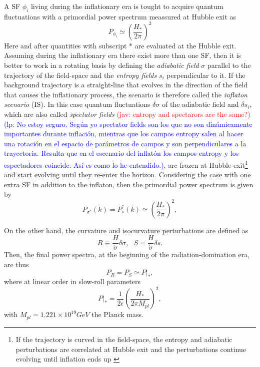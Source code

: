 \documentclass[amssymb,twocolumn,prd,nofootinbib,showpacs]{revtex4-1}
\newcommand{\jav}[1]{\textcolor{red}{(jav: #1)}}
\newcommand{\lp}[1]{\textcolor{blue}{(lp: #1)}}
\begin{document}
%
A  SF $\phi_i$ living  during  the  inflationary  era  is  tought
to acquire quantum fluctuations with a primordial power
spectrum meassured at Hubble exit as
\begin{equation}\label{eq1}
P_{\phi_i}\simeq\left(\frac{H_*}{2\pi}\right)^2
\end{equation}
Here  and  after  quantities  with subscript $*$  are evaluated at the Hubble exit. 
%
Assuming during the inflationary era there exist more than one SF,  then it  is  better  to  work  in  a  rotating  basis by
 defining the \textit{adiabatic field} $\sigma$ parallel  to  the  trajectory  of the field-space 
 and the \textit{entropy fields} $s_i$ perpendicular to it. 
 If the background trajectory is a straight-line that evolves in the direction of the field that causes the inflationary process, 
 the scenario is therefore called the \textit{inflaton scenario} (IS). 
 In this  case quantum fluctuations $\delta\sigma$ of  the  adiabatic field  and $\delta s_i$,  which  are  also  
 called  \textit{spectator fields} \jav{entropy and spectarors are the same?}\lp{No estoy seguro. Seg\'un yo spectator fields son los que no son din\'amicamente importantes durante inflaci\'on, mientras que los campos entropy salen al hacer una rotaci\'on en el espacio de par\'ametros de campos y son perpendiculares a la trayectoria. Resulta que en el escenario del inflat\'on los campos entropy y los espectadores coincide. As\'i es como lo he entendido.}, 
 are frozen at Hubble exit\footnote{If the trajectory is curved in the field-space, 
 the entropy and adiabatic perturbations are correlated at Hubble exit and the 
 perturbations continue evolving until inflation ends up \cite{twofields}} and start evolving 
 until they re-enter the horizon. Considering the case with one extra SF in 
 addition to the inflaton, then the primordial power spectrum is given by
\begin{equation}\label{eq2}
P_{\sigma^*}(k)=P_{s}^*(k)\simeq\left(\frac{H_*}{2\pi}\right)^2,
\end{equation}

On the other hand, the curvature and isocurvature perturbations are defined as
%
\begin{equation}\label{RS}
R\equiv\frac{H}{\dot\sigma}\delta \sigma, \ \ \ S=\frac{H}{\dot \sigma}\delta s.
\end{equation}
Then, the final power spectra, at the beginning of the radiation-domination era, are thus
%
\begin{equation}\label{PRf}
P_R=P_S\simeq P|_*,
\end{equation}
%
where at linear order in slow-roll parameters
%
\begin{equation}
P|_*=\frac{1}{2\epsilon}\left(\frac{H_*}{2\pi M_{pl}}\right)^2,
\end{equation}
%
with $M_{pl}=1.221\times 10^{19}GeV$ the Planck mass.\\
\end{document}
